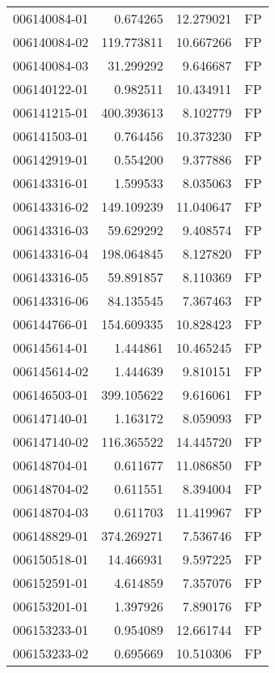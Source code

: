 \begin{tabular}{lrrl}
006140084-01 &    0.674265 &      12.279021 &   FP \\
006140084-02 &  119.773811 &      10.667266 &   FP \\
006140084-03 &   31.299292 &       9.646687 &   FP \\
006140122-01 &    0.982511 &      10.434911 &   FP \\
006141215-01 &  400.393613 &       8.102779 &   FP \\
006141503-01 &    0.764456 &      10.373230 &   FP \\
006142919-01 &    0.554200 &       9.377886 &   FP \\
006143316-01 &    1.599533 &       8.035063 &   FP \\
006143316-02 &  149.109239 &      11.040647 &   FP \\
006143316-03 &   59.629292 &       9.408574 &   FP \\
006143316-04 &  198.064845 &       8.127820 &   FP \\
006143316-05 &   59.891857 &       8.110369 &   FP \\
006143316-06 &   84.135545 &       7.367463 &   FP \\
006144766-01 &  154.609335 &      10.828423 &   FP \\
006145614-01 &    1.444861 &      10.465245 &   FP \\
006145614-02 &    1.444639 &       9.810151 &   FP \\
006146503-01 &  399.105622 &       9.616061 &   FP \\
006147140-01 &    1.163172 &       8.059093 &   FP \\
006147140-02 &  116.365522 &      14.445720 &   FP \\
006148704-01 &    0.611677 &      11.086850 &   FP \\
006148704-02 &    0.611551 &       8.394004 &   FP \\
006148704-03 &    0.611703 &      11.419967 &   FP \\
006148829-01 &  374.269271 &       7.536746 &   FP \\
006150518-01 &   14.466931 &       9.597225 &   FP \\
006152591-01 &    4.614859 &       7.357076 &   FP \\
006153201-01 &    1.397926 &       7.890176 &   FP \\
006153233-01 &    0.954089 &      12.661744 &   FP \\
006153233-02 &    0.695669 &      10.510306 &   FP \\

\end{tabular}
